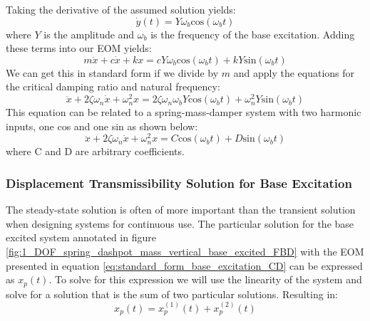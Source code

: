 \documentclass[12pt,letter]{article}
\numberwithin{ex}{section} %
\numberwithin{re}{section} %
\begin{document}
			Taking the derivative of the assumed solution yields:
			\begin{equation}
			\dot{y}(t) = Y \omega_b \text{cos}(\omega_b t)
			\end{equation}
			where $Y$ is the amplitude and $\omega_b$ is the frequency of the base excitation. Adding these terms into our EOM yields:
			\begin{equation}
			m\ddot{x} + c\dot{x} + kx = c Y \omega_b \text{cos}(\omega_b t)  + k Y\text{sin}(\omega_b t)  
			\end{equation}
			We can get this in standard form if we divide by $m$ and apply the equations for the critical damping ratio and natural frequency:
			\begin{equation}
			\ddot{x} + 2 \zeta \omega_n \dot{x} + \omega_n^2x = 2 \zeta \omega_n \omega_b Y \text{cos}(\omega_b t)  + \omega_n^2 Y\text{sin}(\omega_b t)
			\label{eq:standard_form_base_excitation}  
			\end{equation}
			This equation can be related to a spring-mass-damper system with two harmonic inputs, one cos and one sin as shown below:
			\begin{equation}
			\ddot{x} + 2 \zeta \omega_n \dot{x} + \omega_n^2x = C \text{cos}(\omega_b t)  + D \text{sin}(\omega_b t)  
			\label{eq:standard_form_base_excitation_CD}
			\end{equation}
			where C and D are arbitrary coefficients. 

	
			\subsubsection{Displacement Transmissibility Solution for Base Excitation}
				The steady-state solution is often of more important than the transient solution when designing systems for continuous use. The particular solution for the base excited system annotated in figure \ref{fig:1_DOF_spring_dashpot_mass_vertical_base_excited_FBD} with the EOM presented in equation \ref{eq:standard_form_base_excitation_CD} can be expressed as $	x_p(t)$. To solve for this expression we will use the linearity of the system and solve for a solution that is the sum of two particular solutions. Resulting in:
				\begin{equation}
				 x_p(t) = 	x_p^{(1)}(t) + 	x_p^{(2)}(t)  
				\end{equation}
				
\end{document}
